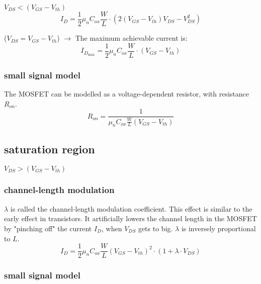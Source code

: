 \documentclass[11ypt]{extarticle}
\begin{document}
$V_{DS} < (V_{GS} - V_{th})$
\begin{equation}
    I_D = \frac{1}{2} \mu_n C_{ox} \frac{W}{L} \cdot (2(V_{GS} - V_{th})V_{DS} - {V_{DS}^2})
\end{equation}

($V_{DS} = V_{GS} - V_{th}$) $\rightarrow$ The maximum achievable current is: 
\begin{equation}
    I_{D_{\text{max}}} = \frac{1}{2} \mu_n C_{ox} \frac{W}{L} \cdot (V_{GS} - V_{th})
\end{equation}

\subsubsection{small signal model}

The MOSFET can be modelled as a voltage-dependent resistor, with resistance $R_{on}$.
\begin{equation}
   R_{on} = \frac{1}{\mu_n C_{ox} \frac{W}{L}(V_{GS} - V_{th})}
\end{equation}

\subsection{saturation region}

$V_{DS} > (V_{GS} - V_{th})$

\subsubsection{channel-length modulation}

$\lambda$ is called the channel-length modulation coefficient. This effect is similar to the early effect in transistors. It artificially lowers the channel length in the MOSFET by "pinching off" the current $I_D$, when $V_{DS}$ gets to big. $\lambda$ is inversely proportional to $L$.
\begin{equation}
    I_D= \frac{1}{2}\mu_n C_{ox} \frac{W}{L}(V_{GS} - V_{th})^2 \cdot (1 + \lambda \cdot V_{DS}) 
\end{equation}

\subsubsection{small signal model}
\end{document}
